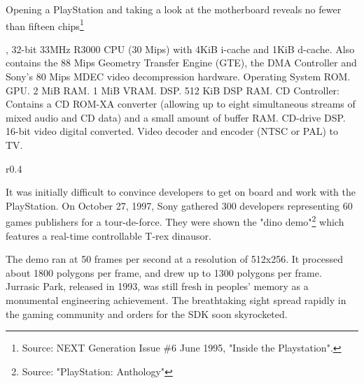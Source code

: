 \par
Opening a PlayStation and taking a look at the motherboard reveals no fewer than fifteen chips\footnote{Source: NEXT Generation Issue \#6 June 1995, "Inside the Playstation".}\\
\par
{}, 32-bit 33MHz R3000 CPU (30 Mips) with  4KiB i-cache and 1KiB d-cache. Also contains the 88 Mips Geometry Transfer Engine (GTE), the DMA Controller and Sony's 80 Mips MDEC video decompression hardware.
 Operating System ROM.
 GPU.
 2 MiB RAM.
 1 MiB VRAM.
 DSP.
 512 KiB DSP RAM.
 CD Controller: Contains a CD ROM-XA converter (allowing up to eight simultaneous streams of mixed audio and CD data) and a small amount of buffer RAM.
 CD-drive DSP.
 16-bit video digital converted.
 Video decoder and encoder (NTSC or PAL) to TV.


\par
\begin{wrapfigure}[10]{r}{0.4\textwidth}{
\centering {}}
\end{wrapfigure}
It was initially difficult to convince developers to get on board and work with the PlayStation. On October 27, 1997, Sony gathered 300 developers representing 60 games publishers for a tour-de-force. They were shown the "dino demo"\footnote{Source: "PlayStation: Anthology"} which features a real-time controllable T-rex dinausor.\\
\par The demo ran at 50 frames per second at a resolution of 512x256. It processed about 1800 polygons per frame, and drew up to 1300 polygons per frame. Jurrasic Park, released in 1993, was still fresh in peoples' memory as a monumental engineering achievement. The breathtaking sight spread rapidly in the gaming community and orders for the SDK soon skyrocketed.
 
 






